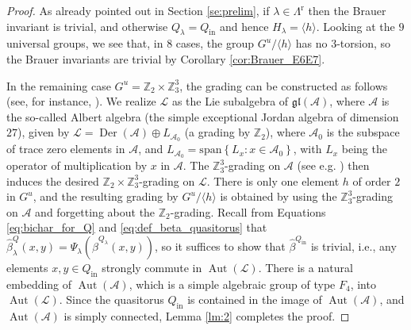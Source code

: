 \documentclass[a4paper,reqno]{amsart}
\theoremstyle{definition}
\numberwithin{theorem}{section}
\numberwithin{equation}{section}
\begin{document}
\begin{proof}
As already pointed out in Section \ref{se:prelim}, if $\lambda\in\Lambda^\mathrm{r}$ then the Brauer invariant is trivial, and otherwise $Q_\lambda=Q_\mathrm{in}$ and hence $H_\lambda=\langle h\rangle$. Looking at the $9$ universal groups, we see that, in $8$ cases, the group  $G^u/\langle h\rangle$ has no $3$-torsion, so the Brauer invariants are trivial by Corollary \ref{cor:Brauer_E6E7}. 

In the remaining case $G^u={\mathbb{Z}}_2\times{\mathbb{Z}}_3^3$, the grading can be constructed as follows (see, for instance, \cite[\S 6.2]{EK_mon}). We realize ${\mathcal{L}}$ as the Lie subalgebra of ${{\mathfrak{gl}}}({\mathcal{A}})$, where ${\mathcal{A}}$ is the so-called Albert algebra (the simple exceptional Jordan algebra of dimension $27$), given by ${\mathcal{L}}=\operatorname{\mathrm{Der}}({\mathcal{A}})\oplus L_{{\mathcal{A}}_0}$ (a grading by ${\mathbb{Z}}_2$), where ${\mathcal{A}}_0$ is the subspace of trace zero elements in ${\mathcal{A}}$, and $L_{{\mathcal{A}}_0}={\mathrm{span}\left\{{L_x:x\in{\mathcal{A}}_0}\right\}}$, with $L_x$ being the operator of multiplication by $x$ in ${\mathcal{A}}$. The ${\mathbb{Z}}_3^3$-grading on ${\mathcal{A}}$ (see e.g. \cite[\S 5.2]{EK_mon}) then induces the desired ${\mathbb{Z}}_2\times{\mathbb{Z}}_3^3$-grading on ${\mathcal{L}}$.
There is only one element $h$ of order $2$ in $G^u$, and the resulting grading by $G^u/\langle h\rangle$ is obtained by using the ${\mathbb{Z}}_3^3$-grading on ${\mathcal{A}}$ and forgetting about the ${\mathbb{Z}}_2$-grading. Recall from Equations \eqref{eq:bichar_for_Q} and \eqref{eq:def_beta_quasitorus} that $\hat{\beta}^Q_\lambda(x,y)=\Psi_\lambda(\hat{\beta}^{Q_\lambda}(x,y))$, so it suffices to show that $\hat{\beta}^{Q_\mathrm{in}}$ is trivial, i.e., any elements $x,y\in Q_\mathrm{in}$ strongly commute in $\operatorname{\mathrm{Aut}}({\mathcal{L}})$. There is a natural embedding of $\operatorname{\mathrm{Aut}}({\mathcal{A}})$, which is a simple algebraic group of type $F_4$, into $\operatorname{\mathrm{Aut}}({\mathcal{L}})$. Since the quasitorus $Q_\mathrm{in}$ is contained in the image of $\operatorname{\mathrm{Aut}}({\mathcal{A}})$, and $\operatorname{\mathrm{Aut}}({\mathcal{A}})$ is simply connected, Lemma \ref{lm:2} completes the proof. 
\end{proof}
\end{document}
